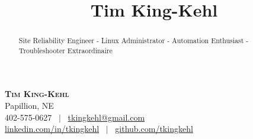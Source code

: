 \documentclass[10pt, a4paper]{article}
\title{\textbf{Tim King-Kehl}}
\date{}
\begin{document}
\begin{center}
    \textbf{\Huge \scshape Tim King-Kehl} \\ \vspace{1pt}
    Papillion, NE \\ \vspace{1pt}
     402-575-0627 \ $|$ \ \url{tkingkehl@gmail.com} \\ \vspace{1pt} 
     \url{linkedin.com/in/tkingkehl} \ $|$ \ \url{github.com/tkingkehl} \\ \vspace{1pt} 
\end{center}
\begin{abstract}
Site Reliability Engineer - Linux Administrator - Automation Enthusiast - Troubleshooter Extraordinaire
\end{abstract}
\end{document}
